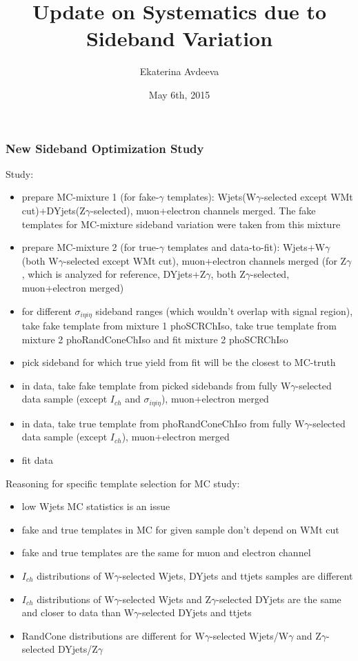 \documentclass{beamer}
\title{Update on Systematics due to Sideband Variation}
\author{Ekaterina Avdeeva}
\institute{University of Nebraska - Lincoln}
\date{May 6th, 2015}
\begin{document}
\begin{frame}
\titlepage
\end{frame}

\begin{frame}\frametitle{New Sideband Optimization Study}
    \scriptsize
    Study:
    \begin{itemize}
    \tiny
      \item prepare MC-mixture 1 (for fake-$\gamma$ templates): Wjets(W$\gamma$-selected except WMt cut)+DYjets(Z$\gamma$-selected), muon+electron channels merged. The fake templates for MC-mixture sideband variation were taken from this mixture
      \item prepare MC-mixture 2 (for true-$\gamma$ templates and data-to-fit):  Wjets+W$\gamma$(both W$\gamma$-selected except WMt cut), muon+electron channels merged (for Z$\gamma$, which is analyzed for reference, DYjets+Z$\gamma$, both Z$\gamma$-selected, muon+electron merged) 
      \item for different $\sigma_{i\eta{i}\eta}$ sideband ranges (which wouldn't overlap with signal region), take fake template from mixture 1 phoSCRChIso, take true template from mixture 2 phoRandConeChIso and fit mixture 2 phoSCRChIso
      \item pick sideband for which true yield from fit will be the closest to MC-truth
      \item in data, take fake template from picked sidebands from fully W$\gamma$-selected data sample (except $I_{ch}$ and $\sigma_{i\eta{i}\eta}$), muon+electron merged
      \item in data, take true template from phoRandConeChIso from fully W$\gamma$-selected data sample (except $I_{ch}$), muon+electron merged
      \item fit data  
    \end{itemize}
    Reasoning for specific template selection for MC study:
    \begin{itemize}
    \tiny
      \item low Wjets MC statistics is an issue
      \item fake and true templates in MC for given sample don't depend on WMt cut 
      \item fake and true templates are the same for muon and electron channel
      \item $I_{ch}$ distributions of W$\gamma$-selected Wjets, DYjets and ttjets samples are different
      \item $I_{ch}$ distributions of W$\gamma$-selected Wjets and Z$\gamma$-selected DYjets are the same and closer to data than W$\gamma$-selected DYjets and ttjets
      \item RandCone distributions are different for W$\gamma$-selected Wjets/W$\gamma$ and Z$\gamma$-selected DYjets/Z$\gamma$
    \end{itemize}
\end{frame}
\end{document}
